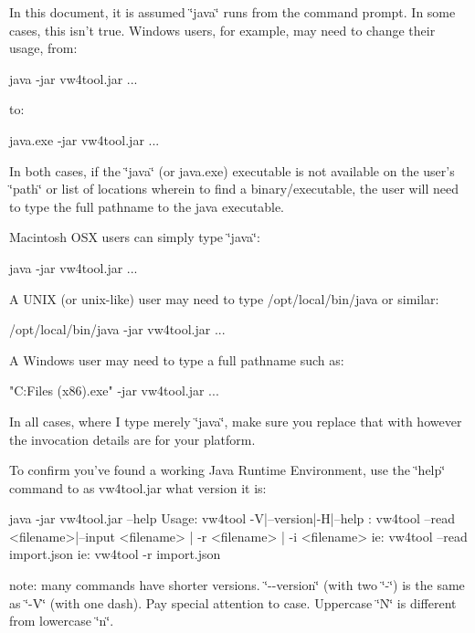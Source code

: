 In this document, it is assumed \char`\"{}java\char`\"{} runs from the command prompt. In some cases, this isn't true. Windows users, for example, may need to change their usage, from\+: \begin{DoxyVerb}java -jar vw4tool.jar ...
\end{DoxyVerb}


to\+: \begin{DoxyVerb}java.exe -jar vw4tool.jar ...
\end{DoxyVerb}


In both cases, if the \char`\"{}java\char`\"{} (or java.\+exe) executable is not available on the user's \char`\"{}path\char`\"{} or list of locations wherein to find a binary/executable, the user will need to type the full pathname to the java executable.

Macintosh O\+S\+X users can simply type \char`\"{}java\char`\"{}\+: \begin{DoxyVerb}java -jar vw4tool.jar ...
\end{DoxyVerb}


A U\+N\+I\+X (or unix-\/like) user may need to type /opt/local/bin/java or similar\+: \begin{DoxyVerb}/opt/local/bin/java -jar vw4tool.jar ...
\end{DoxyVerb}


A Windows user may need to type a full pathname such as\+: \begin{DoxyVerb}"C:\Program Files (x86)\Java{}\bin\java.exe" -jar vw4tool.jar ...
\end{DoxyVerb}


In all cases, where I type merely \char`\"{}java\char`\"{}, make sure you replace that with however the invocation details are for your platform.

To confirm you've found a working Java Runtime Environment, use the \char`\"{}help\char`\"{} command to as vw4tool.\+jar what version it is\+: \begin{DoxyVerb}java -jar vw4tool.jar --help
Usage: vw4tool -V|--version|-H|--help
     : vw4tool --read <filename>|--input <filename> | -r <filename> | -i <filename>
   ie: vw4tool --read import.json
   ie: vw4tool -r import.json
\end{DoxyVerb}


note\+: many commands have shorter versions. \char`\"{}-\/-\/version\char`\"{} (with two \char`\"{}-\/\char`\"{}) is the same as \char`\"{}-\/\+V\char`\"{} (with one dash). Pay special attention to case. Uppercase \char`\"{}\+N\char`\"{} is different from lowercase \char`\"{}n\char`\"{}.

